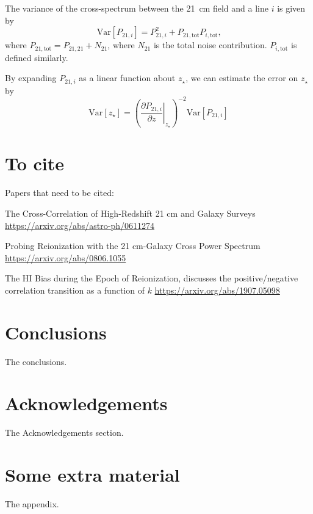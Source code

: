 \documentclass[a4paper,fleqn,usenatbib]{mnras}
\newcommand{\beq}{\begin{equation}}
\newcommand{\eeq}{\end{equation}}
\newcommand{\zst}{\ensuremath{z_{\star}}}
\newcommand{\Var}[1]{\mathrm{Var}[#1]}
\begin{document}
The variance of the cross-spectrum between the 21~cm field and a line $i$ is
given by \citep[e.g.][]{2007ApJ...660.1030F}
\beq \label{eq:var_xps}
\Var{P_{21,i}} = P_{21,i}^2 + 
                                  P_{21,\text{tot}} P_{i,\text{tot}}\text{,}
\eeq
where $P_{21,\text{tot}} = P_{21,21} + N_{21}$, where $N_{21}$ is the total
noise contribution. $P_{i,\text{tot}}$ is defined similarly.

By expanding $P_{21,i}$ as a linear function about \zst{}, we can estimate the
error on \zst{} by
\beq \label{eq:error_on_zst}
\Var{\zst} = \left(\left.\frac{\partial P_{21,i}}{\partial z}\right|_{\zst}\right)^{-2} \Var{P_{21,i}}
\eeq

\section{To cite}
Papers that need to be cited:

The Cross-Correlation of High-Redshift 21 cm and Galaxy Surveys
\url{https://arxiv.org/abs/astro-ph/0611274}

Probing Reionization with the 21 cm-Galaxy Cross Power Spectrum
\url{https://arxiv.org/abs/0806.1055}

The HI Bias during the Epoch of Reionization, discusses the positive/negative
correlation transition as a function of $k$
\url{https://arxiv.org/abs/1907.05098}

\section{Conclusions} \label{sec:conclusions}

The conclusions.

\section*{Acknowledgements}

The Acknowledgements section.






\appendix

\section{Some extra material}

The appendix.



\bsp	%
\label{lastpage}
\end{document}
